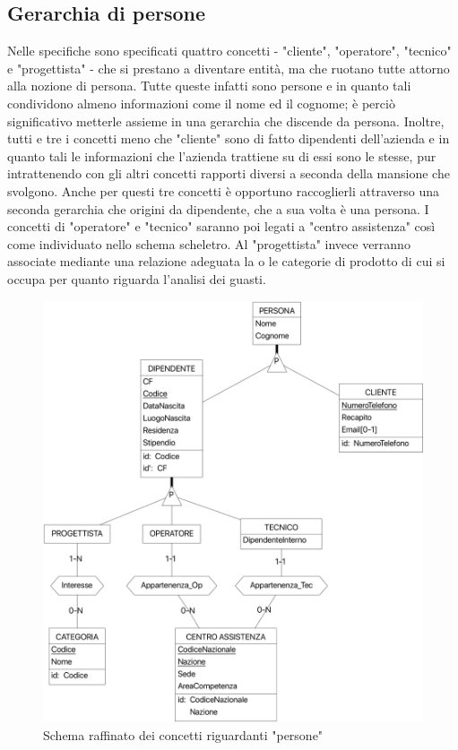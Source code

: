 \documentclass[a4paper, 12pt]{report}
\begin{document}
\subsection{Gerarchia di persone}

Nelle specifiche sono specificati quattro concetti - "cliente", "operatore", "tecnico" e "progettista" - che si prestano a diventare entità, ma
che ruotano tutte attorno alla nozione di persona. Tutte queste infatti sono persone e in quanto tali condividono almeno informazioni come il nome
ed il cognome; è perciò significativo metterle assieme in una gerarchia che discende da persona. Inoltre, tutti e tre i concetti meno che "cliente"
sono di fatto dipendenti dell'azienda e in quanto tali le informazioni che l'azienda trattiene su di essi sono le stesse, pur intrattenendo con gli
altri concetti rapporti diversi a seconda della mansione che svolgono. Anche per questi tre concetti è opportuno raccoglierli attraverso una seconda
gerarchia che origini da dipendente, che a sua volta è una persona. I concetti di "operatore" e "tecnico" saranno poi legati a "centro assistenza"
così come individuato nello schema scheletro. Al "progettista" invece verranno associate mediante una relazione adeguata la o le categorie di prodotto 
di cui si occupa per quanto riguarda l'analisi dei guasti.

\begin{figure}[H]
	\centering
	\includegraphics[width=\linewidth]{images/persone.png}
	\caption{Schema raffinato dei concetti riguardanti "persone"}
\end{figure}
\end{document}
